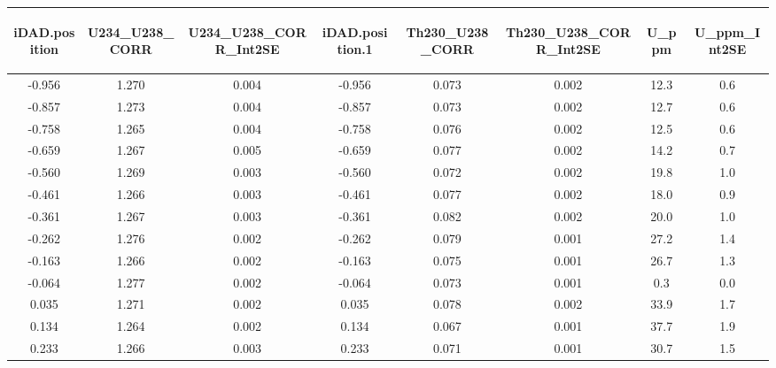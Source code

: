 \documentclass[]{elsarticle} %
\begin{document}
\begin{table}[ht]
\centering
\begin{tabular}{cccccccc}
  \hline
\begin{sideways} iDAD.position \end{sideways} & \begin{sideways} U234\_U238\_CORR \end{sideways} & \begin{sideways} U234\_U238\_CORR\_Int2SE \end{sideways} & \begin{sideways} iDAD.position.1 \end{sideways} & \begin{sideways} Th230\_U238\_CORR \end{sideways} & \begin{sideways} Th230\_U238\_CORR\_Int2SE \end{sideways} & \begin{sideways} U\_ppm \end{sideways} & \begin{sideways} U\_ppm\_Int2SE \end{sideways} \\ 
  \hline
-0.956 & 1.270 & 0.004 & -0.956 & 0.073 & 0.002 & 12.3 & 0.6 \\ 
  -0.857 & 1.273 & 0.004 & -0.857 & 0.073 & 0.002 & 12.7 & 0.6 \\ 
  -0.758 & 1.265 & 0.004 & -0.758 & 0.076 & 0.002 & 12.5 & 0.6 \\ 
  -0.659 & 1.267 & 0.005 & -0.659 & 0.077 & 0.002 & 14.2 & 0.7 \\ 
  -0.560 & 1.269 & 0.003 & -0.560 & 0.072 & 0.002 & 19.8 & 1.0 \\ 
  -0.461 & 1.266 & 0.003 & -0.461 & 0.077 & 0.002 & 18.0 & 0.9 \\ 
  -0.361 & 1.267 & 0.003 & -0.361 & 0.082 & 0.002 & 20.0 & 1.0 \\ 
  -0.262 & 1.276 & 0.002 & -0.262 & 0.079 & 0.001 & 27.2 & 1.4 \\ 
  -0.163 & 1.266 & 0.002 & -0.163 & 0.075 & 0.001 & 26.7 & 1.3 \\ 
  -0.064 & 1.277 & 0.002 & -0.064 & 0.073 & 0.001 & 0.3 & 0.0 \\ 
  0.035 & 1.271 & 0.002 & 0.035 & 0.078 & 0.002 & 33.9 & 1.7 \\ 
  0.134 & 1.264 & 0.002 & 0.134 & 0.067 & 0.001 & 37.7 & 1.9 \\ 
  0.233 & 1.266 & 0.003 & 0.233 & 0.071 & 0.001 & 30.7 & 1.5 \\ 

\end{tabular}
\end{table}
\end{document}
